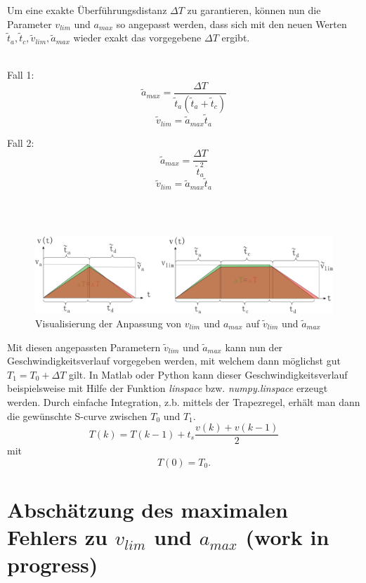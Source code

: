 \documentclass[a4paper, 10pt]{scrartcl}
\begin{document}
		Um eine exakte Überführungsdistanz $ \Delta T $ zu garantieren, können nun die Parameter $ v_{lim} $ und $ a_{max} $ so angepasst werden, dass sich mit den neuen Werten $ \tilde{t}_{a},\tilde{t}_{c},\tilde{v}_{lim}, \tilde{a}_{max} $ wieder exakt das vorgegebene $ \Delta T $ ergibt.\\\\ 
		
		\begin{minipage}{0.45\textwidth}
			Fall 1:
			\[\tilde{a}_{max} = \dfrac{\Delta T}{\tilde{t}_{a}(\tilde{t}_{a}+\tilde{t}_{c})}\]
			\[\tilde{v}_{lim} = \tilde{a}_{max}\tilde{t}_{a}\]
		\end{minipage}%
		\hfill
		\begin{minipage}{0.45\textwidth}
			Fall 2:
			\[\tilde{a}_{max} = \dfrac{\Delta T}{\tilde{t}_{a}^{2}}\]
			\[\tilde{v}_{lim} = \tilde{a}_{max}\tilde{t}_{a}\]
		\end{minipage}\\\\
		
		\begin{figure}[h!]
			\centering
			\includegraphics[width=\linewidth]{./pics/bedingungen_tilde.png}
			\caption{Visualisierung der Anpassung von $ v_{lim} $ und $ a_{max} $ auf $ \tilde{v}_{lim} $ und $ \tilde{a}_{max} $}
		\end{figure}
		Mit diesen angepassten Parametern $ \tilde{v}_{lim} $ und $ \tilde{a}_{max} $ kann nun der Geschwindigkeitsverlauf vorgegeben werden, mit welchem dann möglichst gut $ T_{1} = T_{0} + \Delta T $ gilt. In Matlab oder Python kann dieser Geschwindigkeitsverlauf beispielsweise mit Hilfe der Funktion \textit{linspace} bzw. \textit{numpy.linspace} erzeugt werden. Durch einfache Integration, z.b. mittels der Trapezregel, erhält man dann die gewünschte S-curve zwischen $ T_{0} $ und $ T_{1} $.
		\[ T(k) = T(k-1) + t_{s}\dfrac{v(k) + v(k-1)}{2}    \]
		mit 
		\[ T(0) = T_{0}.\]
		
	
	\section{Abschätzung des maximalen Fehlers zu $ v_{lim} $ und $ a_{max} $ (work in progress)}
	
\end{document}
